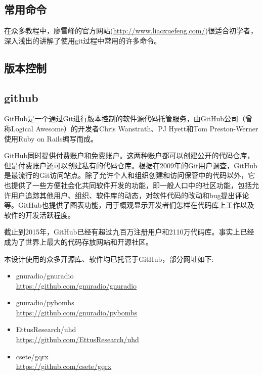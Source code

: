 	\subsection{常用命令}
	\par 在众多教程中，廖雪峰的官方网站(\href{http://www.liaoxuefeng.com/}{http://www.liaoxuefeng.com/})很适合初学者，深入浅出的讲解了使用git过程中常用的许多命令。
	\subsection{版本控制}
	\subsection{github}
	\par GitHub是一个通过Git进行版本控制的软件源代码托管服务，由GitHub公司（曾称Logical Awesome）的开发者Chris Wanstrath、PJ Hyett和Tom Preston-Werner使用Ruby on Rails编写而成。
	\par GitHub同时提供付费账户和免费账户。这两种账户都可以创建公开的代码仓库，但是付费账户还可以创建私有的代码仓库。根据在2009年的Git用户调查，GitHub是最流行的Git访问站点。除了允许个人和组织创建和访问保管中的代码以外，它也提供了一些方便社会化共同软件开发的功能，即一般人口中的社区功能，包括允许用户追踪其他用户、组织、软件库的动态，对软件代码的改动和bug提出评论等。GitHub也提供了图表功能，用于概观显示开发者们怎样在代码库上工作以及软件的开发活跃程度。
	\par 截止到2015年，GitHub已经有超过九百万注册用户和2110万代码库。事实上已经成为了世界上最大的代码存放网站和开源社区。\cite{ wiki:GitHub}
	\par 本设计使用的众多开源库、软件均已托管于GitHub，部分网址如下:
	\begin{itemize}
		\item gnuradio/gnuradio\\\href{https://github.com/gnuradio/gnuradio}{https://github.com/gnuradio/gnuradio}
		\item gnuradio/pybombs\\\href{https://github.com/gnuradio/pybombs}{https://github.com/gnuradio/pybombs}
		\item EttusResearch/uhd\\\href{https://github.com/EttusResearch/uhd}{https://github.com/EttusResearch/uhd}
		\item csete/gqrx\\\href{https://github.com/csete/gqrx}{https://github.com/csete/gqrx}
	\end{itemize}
